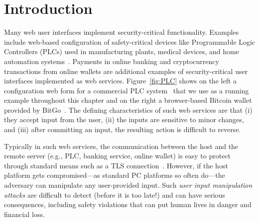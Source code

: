 \section{Introduction}
\label{sec:introduction}

Many web user interfaces implement security-critical functionality. Examples include web-based configuration of safety-critical devices like Programmable Logic Controllers (PLCs) used in manufacturing plants, medical devices, and home automation systems~\cite{7306669,siemens,siemens2,schneider}. Payments in online banking and cryptocurrency transactions from online wallets are additional examples of security-critical user interfaces implemented as web services. Figure~\ref{fig:PLC} shows on the left a configuration web form for a commercial PLC system~\cite{controlbyweb} that we use as a running example throughout this chapter and on the right a browser-based Bitcoin wallet provided by BitGo~\cite{bitgo}. The defining characteristics of such web services are that (i) they accept input from the user, (ii) the inputs are sensitive to minor changes, and (iii) after committing an input, the resulting action is difficult to reverse.


Typically in such web services, the communication between the host and the remote server (e.g., PLC, banking service, online wallet) is easy to protect through standard means such as a TLS connection~\cite{dierks2008transport}. However, if the host platform gets compromised---as standard PC platforms so often do---the adversary can manipulate any user-provided input. Such \emph{user input manipulation attacks} are difficult to detect (before it is too late!) and can have serious consequences, including safety violations that can put human lives in danger and financial loss. 

